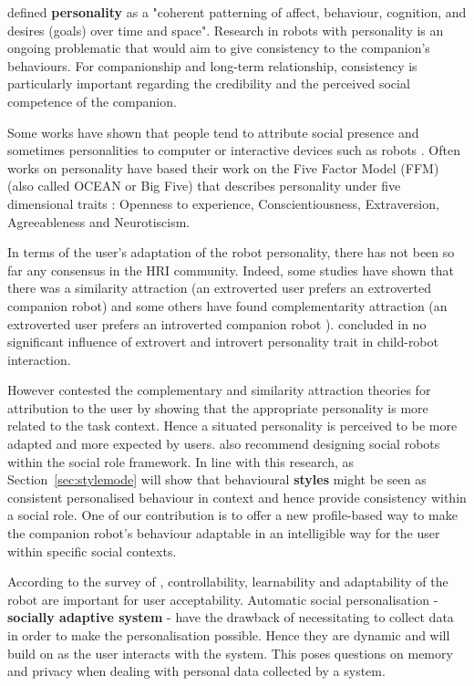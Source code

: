 \documentclass[a4paper,twocolumn]{svjour3}
\begin{document}
\cite{Revelle2009} defined \textbf{personality} as a "coherent patterning of affect, behaviour, cognition, and desires (goals) over time and space". 
Research in robots with personality is an ongoing problematic that would aim to give consistency to the companion's behaviours.
For companionship and long-term relationship, consistency is particularly important regarding the credibility and the perceived social competence of the companion. 

Some works have shown that people tend to attribute social presence and sometimes personalities to computer or interactive devices such as robots \cite{Woods2006,Meerbeek2009}. 
Often works on personality have based their work on the Five Factor Model (FFM) (also called OCEAN or Big Five) that describes personality under five dimensional traits : Openness to experience, Conscientiousness, Extraversion, Agreeableness and Neurotiscism. 


In terms of the user's adaptation of the robot personality, there has not been so far any consensus in the HRI community. 
Indeed, some studies have shown that there was a similarity attraction (an extroverted user prefers an extroverted companion robot) \cite{Isbister2000} and some others have found complementarity attraction (an extroverted user prefers an introverted companion robot \cite{Lee2006,Tapus2008}). 
\cite{Belpaeme2012a} concluded in no significant influence of extrovert and introvert personality trait in child-robot interaction.

However \cite{Joosse2013a} contested the complementary and similarity attraction theories for attribution to the user by showing that the appropriate personality is more related to the task context. 
Hence a situated personality is perceived to be more adapted and more expected by users. 
\cite{Tay2014} also recommend designing social robots within the social role framework. 
In line with this research, as Section~\ref{sec:stylemode} will show that behavioural \textbf{styles} might be seen as consistent personalised behaviour in context and hence provide consistency within a social role. 
One of our contribution is to offer a new profile-based way to make the companion robot's behaviour adaptable in an intelligible way for the user within specific social contexts. 

According to the survey of \cite{Mahani2009}, controllability, learnability and adaptability of the robot are important for user acceptability. 
Automatic social personalisation - \textbf{socially adaptive system} - have the drawback of necessitating to collect data in order to make the personalisation possible. 
Hence they are dynamic and will build on as the user interacts with the system. 
This poses questions on memory and privacy when dealing with personal data collected by a system. 
\end{document}
